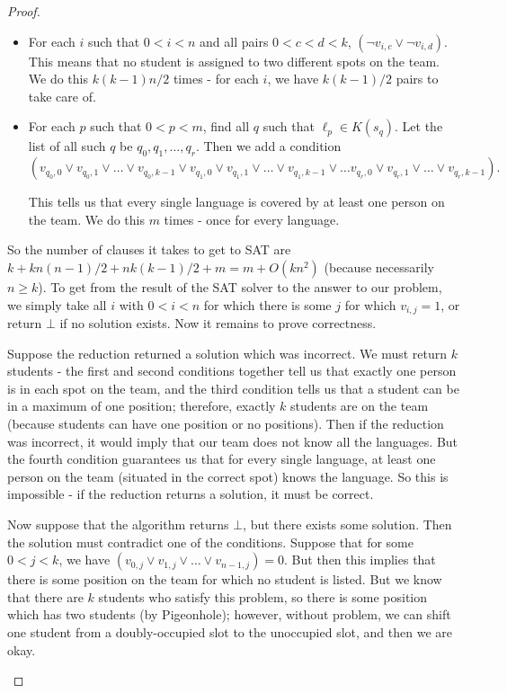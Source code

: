 \documentclass[11pt]{article}
\begin{document}
\begin{enumerate}
\begin{proof}
\begin{enumerate}
\begin{itemize}
\item For each $i$ such that $0 < i < n$ and all pairs $0 < c < d < k$, $(\neg v_{i, c} \vee \neg v_{i, d})$. This means that no student is assigned to two different spots on the team. We do this $k(k - 1)n/2$ times - for each $i$, we have $k(k - 1)/2$ pairs to take care of.

\item For each $p$ such that $0 < p < m$, find all $q$ such that $\ell_p \in K(s_q)$. Let the list of all such $q$ be $q_0, q_1, \dots, q_r$. Then we add a condition 
$$
(v_{q_0, 0} \vee v_{q_0, 1} \vee \dots \vee v_{q_0, k - 1} \vee v_{q_1, 0} \vee v_{q_1, 1} \vee \dots \vee v_{q_1, k - 1} \vee \dots v_{q_r, 0} \vee v_{q_r, 1}\vee \dots \vee v_{q_r, k - 1}).
$$

This tells us that every single language is covered by at least one person on the team. We do this $m$ times - once for every language.
\end{itemize}

So the number of clauses it takes to get to SAT are $k + kn(n - 1)/2 + nk(k - 1)/2 + m = m + O(kn^2)$ (because necessarily $n \geq k$). To get from the result of the SAT solver to the answer to our problem, we simply take all $i$ with $0 < i < n$ for which there is some $j$ for which $v_{i, j} = 1$, or return $\bot$ if no solution exists. Now it remains to prove correctness. 

Suppose the reduction returned a solution which was incorrect. We must return $k$ students - the first and second conditions together tell us that exactly one person is in each spot on the team, and the third condition tells us that a student can be in a maximum of one position; therefore, exactly $k$ students are on the team (because students can have one position or no positions). Then if the reduction was incorrect, it would imply that our team does not know all the languages. But the fourth condition guarantees us that for every single language, at least one person on the team (situated in the correct spot) knows the language. So this is impossible - if the reduction returns a solution, it must be correct.

Now suppose that the algorithm returns $\bot$, but there exists some solution. Then the solution must contradict one of the conditions. Suppose that for some $0 < j < k$, we have $(v_{0, j} \vee v_{1, j} \vee \dots \vee v_{n  - 1, j}) = 0$. But then this implies that there is some position on the team for which no student is listed. But we know that there are $k$ students who satisfy this problem, so there is some position which has two students (by Pigeonhole); however, without problem, we can shift one student from a doubly-occupied slot to the unoccupied slot, and then we are okay.


\end{enumerate}
\end{proof}
\end{enumerate}
\end{document}
